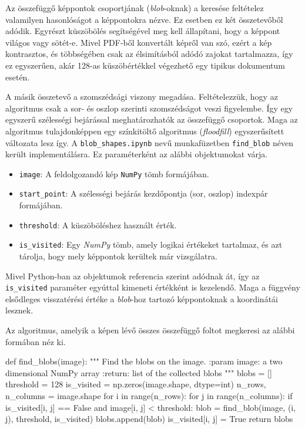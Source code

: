 Az összefüggő képpontok csoportjának (\textit{blob}-oknak) a keresése feltételez valamilyen hasonlóságot a képpontokra nézve. Ez esetben ez két összetevőből adódik. Egyrészt küszöbölés segítségével meg kell állapítani, hogy a képpont világos vagy sötét-e. Mivel PDF-ből konvertált képről van szó, ezért a kép kontrasztos, és többségében csak az élsimításból adódó zajokat tartalmazza, így ez egyszerűen, akár 128-as küszöbértékkel végezhető egy tipikus dokumentum esetén.

A másik összetevő a szomszédsági viszony megadása. Feltételezzük, hogy az algoritmus csak a sor- és oszlop szerinti szomszédságot veszi figyelembe. Így egy egyszerű szélességi bejárással meghatározhatók az összefüggő csoportok.
Maga az algoritmus tulajdonképpen egy színkitöltő algoritmus (\textit{floodfill}) egyszerűsített változata lesz így.
A \texttt{blob\_shapes.ipynb} nevű munkafüzetben \texttt{find\_blob} néven került implementálásra.
Ez paraméterként az alábbi objektumokat várja.
\begin{itemize}
\item \texttt{image}: A feldolgozandó kép \texttt{NumPy} tömb formájában.
\item \texttt{start\_point}: A szélességi bejárás kezdőpontja (sor, oszlop) indexpár formájában.
\item \texttt{threshold}: A küszöböléshez használt érték.
\item \texttt{is\_visited}: Egy \textit{NumPy} tömb, amely logikai értékeket tartalmaz, és azt tárolja, hogy mely képpontok kerültek már vizsgálatra.
\end{itemize}
Mivel Python-ban az objektumok referencia szerint adódnak át, így az \texttt{is\_visited} paraméter egyúttal kimeneti értékként is kezelendő.
Maga a függvény elsődleges visszatérési értéke a \textit{blob}-hoz tartozó képpontoknak a koordinátái lesznek.

Az algoritmus, amelyik a képen lévő összes összefüggő foltot megkeresi az alábbi formában néz ki.
\begin{python}
def find_blobs(image):
    """
    Find the blobs on the image.
    :param image: a two dimensional NumPy array
    :return: list of the collected blobs
    """
    blobs = []
    threshold = 128
    is_visited = np.zeros(image.shape, dtype=int)
    n_rows, n_columns = image.shape
    for i in range(n_rows):
        for j in range(n_columns):
            if is_visited[i, j] == False and image[i, j] < threshold:
                blob = find_blob(image, (i, j), threshold, is_visited)
                blobs.append(blob)
            is_visited[i, j] = True
    return blobs
\end{python}

